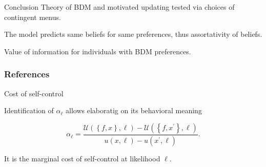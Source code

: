 \documentclass[usenames,dvipsnames,aspectratio=169,11pt, envcountsect]{beamer}
\begin{document}
\begin{comment}
	\begin{equation}
		\begin{aligned}
			\mathcal{U} \left(M ; \ell \left( M_{F} \right) \right) = & \max _{f \in M}\left\{\int_{M_F} u \left( f \left( s \right), \ell \left( M_{F} \right) \right) d p\left(\cdot \mid \ell \left(M_F \right) \right) \right.                \\
			                                                          & \left. +\alpha _{\ell_{M_F}} \int_{M_F} u \left( f \left(s \right) ,  \ell^{\prime}_{M_F} \right) d p\left(\cdot \mid \ell^{\prime}_{M_F} \right)\right\}                 \\
			                                                          & -\max _{f^{\prime} \in M} \alpha _{\ell_{M_F}} \int_{M_F} u\left(f^{\prime}\left(s \right) , \ell^{\prime}_{M_F} \right) d p\left(\cdot \mid \ell^{\prime}_{M_F}\right) .
		\end{aligned} \tag{2}
	\end{equation}

\end{frame}

\end{comment}

\begin{frame}{Conclusion}
	Theory of BDM and motivated updating tested via choices of contingent menus.

	\vfill

	The model predicts same beliefs for same preferences, thus assortativity of beliefs.

	\vfill

	Value of information for individuals with BDM preferences.

\end{frame}

\begin{frame}

	\frametitle{References}

	
	


\end{frame}

\appendix

\begin{frame}{Cost of self-control}

	Identification of \( \alpha_{\ell} \) allows elaboratig on its behavioral meaning

	\vfill

	\[
		\alpha_{\ell} = \frac{\mathcal{U} \left( \left\{f, x \right\}, \ell \right) - \mathcal{U} \left( \left\{f, x^{\prime} \right\}, \ell \right) }{u \left( x , \ell \right) - u \left( x^{\prime} , \ell \right)} .
	\]

	\vfill

	It is the marginal cost of self-control at likelihood \( \ell \).

\end{frame}
\end{document}
